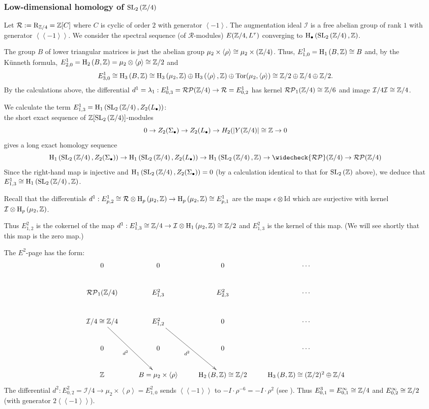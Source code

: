 \documentclass[12pt]{amsart}
\theoremstyle{definition}
\newcommand{\Z}{\Bbb{Z}}
\newcommand{\LL}{L^{\tau}}
\newcommand{\spl}[2]{\operatorname{SL}_{#1}\left(#2\right)}
\newcommand{\rpb}[1]{\mathcal{RP}(#1)}%
\newcommand{\rpbker}[1]{\mathcal{RP}_1(#1)}%
\newcommand{\crpb}[1]{\widecheck{\mathcal{RP}}(#1)}
\newcommand{\<}{\langle}
\renewcommand{\>}{\rangle}
\newcommand{\sgr}[1]{\mathrm{R}_{#1}}%
\newcommand{\an}[1]{\left\langle{#1}\right\rangle}
\newcommand{\pf}[1]{\left\langle\!\left\langle{#1}\right\rangle\!\right\rangle}
\newcommand{\ho}[3]{\mathrm{H}_{#1}\left( #2,#3 \right)}
\begin{document}
\subsubsection{Low-dimensional homology of $\spl{2}{\Z/4}$}
Let $\mathcal{R}:=\sgr{\Z/4}=\Z[C]$ where $C$ is cyclic of order $2$ with generator $\an{-1}$. The augmentation ideal $\mathcal{I}$ is a free abelian group of rank $1$ with generator $\pf{-1}$.
We consider the spectral sequence (of $\mathcal{R}$-modules) $E(\Z/4, \LL)$ converging to 
$\ho{\bullet}{\spl{2}{\Z/4}}{\Z}$.

 The group $B$ of lower triangular matrices is just the abelian group $\mu_2\times \an{\rho}\cong\mu_2\times (\Z/4)$. Thus, $E^1_{1,0}=\ho{1}{B}{\Z}\cong B$ and, by the K\"unneth formula, $E^1_{2,0}=\ho{2}{B}{\Z}=\mu_2\otimes \an{\rho}\cong \Z/2$ and 
\[
E^1_{3,0}\cong\ho{3}{B}{\Z}\cong \ho{3}{\mu_2}{\Z}\oplus\ho{3}{\an{\rho}}{\Z}\oplus\mathrm{Tor}(\mu_2,\an{\rho})\cong \Z/2\oplus\Z/4\oplus\Z/2.
\]
By the calculations above, the differential $d^1=\lambda_1:E^1_{0,3}=\rpb{\Z/4}\to\mathcal{R}=E^1_{0,2}$ has kernel $\rpbker{\Z/4}\cong\Z/6$ and image $\mathcal{I}/4\mathcal{I}\cong \Z/4$. 

We calculate the term $E^1_{1,3}=\ho{1}{\spl{2}{\Z/4}}{Z_2(L_\bullet)}$:\\
 the short exact sequence of 
$\Z[\spl{2}{\Z/4}]$-modules 
\[
0\to Z_2(\Sigma_\bullet)\to Z_2(L_\bullet)\to H_2(|Y(\Z/4)|\cong \Z\to 0
\]
gives a long exact homology sequence
\[
\ho{1}{\spl{2}{\Z/4}}{Z_2(\Sigma_\bullet)}\to\ho{1}{\spl{2}{\Z/4}}{Z_2(L_\bullet)}\to\ho{1}{\spl{2}{\Z/4}}{\Z}\to\crpb{\Z/4}\to\rpb{\Z/4}
\]
Since the right-hand map is injective and $ \ho{1}{\spl{2}{\Z/4}}{Z_2(\Sigma_\bullet)}=0$ (by a calculation identical to that for $\spl{2}{\Z}$ above), we deduce that 
$E^1_{1,3}\cong\ho{1}{\spl{2}{\Z/4}}{\Z}$. 

Recall that the differentials $d^1:E^1_{p,2}\cong  \mathcal{R}\otimes\ho{p}{\mu_2}{\Z}\to\ho{p}{\mu_2}{\Z}\cong E^1_{p,1}$ are the maps $\epsilon\otimes\mathrm{Id}$ which are surjective with kernel $\mathcal{I}\otimes\ho{p}{\mu_2}{\Z}$. 



Thus $E^2_{1,2}$ is the cokernel of the map $d^1:E^1_{1,3}\cong\Z/4\to \mathcal{I}\otimes\ho{1}{\mu_2}{\Z}\cong\Z/2$ and $E^2_{1,3}$ is the kernel of this map. (We will see shortly that this map is the zero map.)

The $E^2$-page has the form:
\[
\xymatrix{
0&0&0&\cdots\\
\rpbker{\Z/4}&E^2_{1,3}&E^2_{2,3}&\cdots\\
\mathcal{I}/4\cong\Z/4\ar_-{d^2}[rdd]&E^2_{1,2}\ar_-{d^2}[rdd]&0&\cdots\\
0&0&0&\cdots\\
\Z&B=\mu_2\times\an{\rho}&\ho{2}{B}{\Z}\cong \Z/2&\ho{3}{B}{\Z}\cong (\Z/2)^{ 2}\oplus\Z/4\\
}
\]
The differential $d^2:E^2_{0,2}=\mathcal{I}/4\to \mu_2\times\an{\rho}=E^2_{1,0}$ sends $\pf{-1}$ to $-I\cdot \rho^{-6}=-I\cdot\rho^2$ (see \cite[Lemma A.6]{hut:bloch1}). 
Thus $E^3_{0,1}=E^\infty_{0,1}\cong \Z/4$ and $E^\infty_{0,2}\cong \Z/2$ (with generator $2\pf{-1}$).
\end{document}
